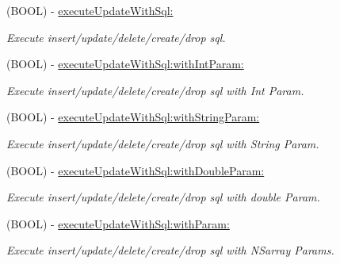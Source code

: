 \begin{DoxyCompactItemize}
\mbox{\label{interface_n_f_l_o_g_sqlite_aeac0b3f877c792581cce970db170632a}} 
(B\+O\+OL) -\/ \hyperlink{interface_n_f_l_o_g_sqlite_aeac0b3f877c792581cce970db170632a}{execute\+Update\+With\+Sql\+:}
\begin{DoxyCompactList}\small\item\em Execute insert/update/delete/create/drop sql. \end{DoxyCompactList}\item 
\mbox{\label{interface_n_f_l_o_g_sqlite_ac5e12455af3f42f04c5fd20c63ac234c}} 
(B\+O\+OL) -\/ \hyperlink{interface_n_f_l_o_g_sqlite_ac5e12455af3f42f04c5fd20c63ac234c}{execute\+Update\+With\+Sql\+:with\+Int\+Param\+:}
\begin{DoxyCompactList}\small\item\em Execute insert/update/delete/create/drop sql with Int Param. \end{DoxyCompactList}\item 
\mbox{\label{interface_n_f_l_o_g_sqlite_a7c2a7ec5d695e83edd89100a5bd9eeca}} 
(B\+O\+OL) -\/ \hyperlink{interface_n_f_l_o_g_sqlite_a7c2a7ec5d695e83edd89100a5bd9eeca}{execute\+Update\+With\+Sql\+:with\+String\+Param\+:}
\begin{DoxyCompactList}\small\item\em Execute insert/update/delete/create/drop sql with String Param. \end{DoxyCompactList}\item 
\mbox{\label{interface_n_f_l_o_g_sqlite_ad7e2365bcb075b28a4b85db1a7209e1d}} 
(B\+O\+OL) -\/ \hyperlink{interface_n_f_l_o_g_sqlite_ad7e2365bcb075b28a4b85db1a7209e1d}{execute\+Update\+With\+Sql\+:with\+Double\+Param\+:}
\begin{DoxyCompactList}\small\item\em Execute insert/update/delete/create/drop sql with double Param. \end{DoxyCompactList}\item 
\mbox{\label{interface_n_f_l_o_g_sqlite_a8e85e2a36f1a207e2dc0265f388c7834}} 
(B\+O\+OL) -\/ \hyperlink{interface_n_f_l_o_g_sqlite_a8e85e2a36f1a207e2dc0265f388c7834}{execute\+Update\+With\+Sql\+:with\+Param\+:}
\begin{DoxyCompactList}\small\item\em Execute insert/update/delete/create/drop sql with N\+Sarray Params. \end{DoxyCompactList}\end{DoxyCompactItemize}


